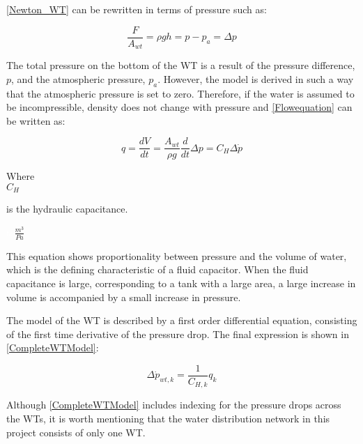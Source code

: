 \eqref{Newton_WT} can be rewritten in terms of pressure such as: 

\begin{equation}
  \frac{F}{A_{wt}} = \rho g h = p - p_a = \Delta p
  \label{Pressuredifference}
\end{equation}

The total pressure on the bottom of the WT is a result of the pressure difference, $p$, and the atmospheric pressure, $p_a$. However, the model is derived in such a way that the atmospheric pressure is set to zero. Therefore, if the water is assumed to be incompressible, density does not change with pressure and \eqref{Flowequation} can be written as: 

\begin{equation}
q = \frac{dV}{dt} = \frac{A_{wt}}{\rho g} \frac{d}{dt} \Delta p = C_H \Delta \dot{p}
  \label{FlowConservation}
\end{equation}

\begin{minipage}[t]{0.20\textwidth}
Where\\
\hspace*{8mm} $C_H$ 
\end{minipage}
\begin{minipage}[t]{0.68\textwidth}
\vspace*{2mm}
is the hydraulic capacitance.
\end{minipage}
\begin{minipage}[t]{0.10\textwidth}
\vspace*{2mm}
\textcolor{White}{te}$\unit{\frac{m^3}{Pa}}$
\end{minipage}

This equation shows proportionality between pressure and the volume of water, which is the defining characteristic of a fluid capacitor. When the fluid capacitance is large, corresponding to a tank with a large area, a large increase in volume is accompanied by a small increase in pressure. 

The model of the WT is described by a first order differential equation, consisting of the first time derivative of the pressure drop. The final expression is shown in \eqref{CompleteWTModel}:

\begin{equation}
  \label{CompleteWTModel}
  \Delta \dot{p}_{wt,k} = \frac{1}{C_{H,k}} q_k 
\end{equation}

Although \eqref{CompleteWTModel} includes indexing for the pressure drops across the WTs, it is worth mentioning that the water distribution network in this project consists of only one WT.


